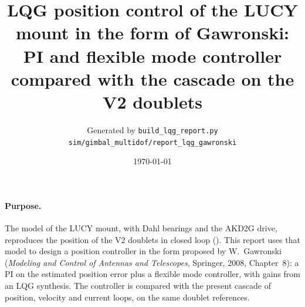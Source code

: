 \documentclass[10pt,a4paper]{article}
\title{LQG position control of the LUCY mount in the form of Gawronski:\\ PI and flexible mode controller compared with the cascade on the V2 doublets}
\author{Generated by \texttt{build\_lqg\_report.py}\\ \small\texttt{sim/gimbal\_multidof/report\_lqg\_gawronski}}
\date{\today}
\numberwithin{equation}{section}
\begin{document}
\maketitle

\paragraph{Purpose.} The model of the LUCY mount, with Dahl bearings and the AKD2G drive, reproduces the position of the V2 doublets in closed loop (). This report uses that model to design a position controller in the form proposed by W.~Gawronski (\emph{Modeling and Control of Antennas and Telescopes}, Springer, 2008, Chapter~8): a PI on the estimated position error plus a flexible mode controller, with gains from an LQG synthesis. The controller is compared with the present cascade of position, velocity and current loops, on the same doublet references.
\end{document}
